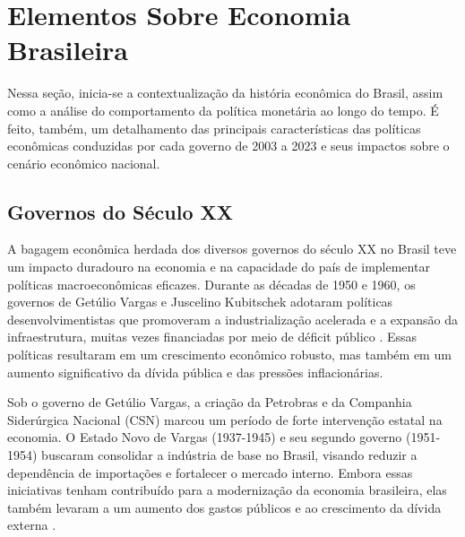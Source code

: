\documentclass[12pt,oneside,a4paper,chapter=TITLE,english,brazil,sumario=abnt-6027-2012]{abntex2}
\begin{document}
\chapter{Elementos Sobre Economia Brasileira}

Nessa seção, inicia-se a contextualização da história econômica do Brasil, assim como a análise do comportamento da política monetária ao longo do tempo. É feito, também, um detalhamento das principais características das políticas econômicas conduzidas por cada governo de 2003 a 2023 e seus impactos sobre o cenário econômico nacional.

\section{Governos do Século XX}


A bagagem econômica herdada dos diversos governos do século XX no Brasil teve um impacto duradouro na economia e na capacidade do país de implementar políticas macroeconômicas eficazes. Durante as décadas de 1950 e 1960, os governos de Getúlio Vargas e Juscelino Kubitschek adotaram políticas desenvolvimentistas que promoveram a industrialização acelerada e a expansão da infraestrutura, muitas vezes financiadas por meio de déficit público \cite{bielschowsky_2022_a}. Essas políticas resultaram em um crescimento econômico robusto, mas também em um aumento significativo da dívida pública e das pressões inflacionárias.

Sob o governo de Getúlio Vargas, a criação da Petrobras e da Companhia Siderúrgica Nacional (CSN) marcou um período de forte intervenção estatal na economia. O Estado Novo de Vargas (1937-1945) e seu segundo governo (1951-1954) buscaram consolidar a indústria de base no Brasil, visando reduzir a dependência de importações e fortalecer o mercado interno. Embora essas iniciativas tenham contribuído para a modernização da economia brasileira, elas também levaram a um aumento dos gastos públicos e ao crescimento da dívida externa \cite{fabiogiambiagi_2016_economia}.
\end{document}

